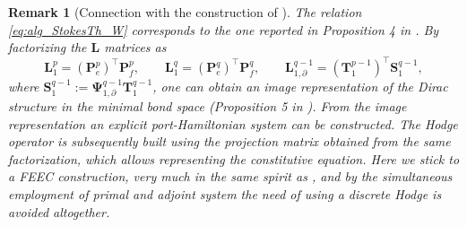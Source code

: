 \documentclass{elsarticle}
\newtheorem{remark}{Remark}
\begin{document}
\begin{remark}[Connection with the construction of \cite{kotyczka2018weak}]
The relation \eqref{eq:alg_StokesTh_W} corresponds to the one reported in Proposition 4 in \cite{kotyczka2018weak}. By factorizing the $\mathbf{L}$ matrices as 
$$\mathbf{L}^p_1 = (\mathbf{P}_e^{p})^\top \mathbf{P}_f^p, \qquad  \mathbf{L}^q_1 = (\mathbf{P}_e^{q})^\top \mathbf{P}_f^q, \qquad  \mathbf{L}^{q-1}_{1, \partial} = (\mathbf{T}^{p-1}_1)^\top \mathbf{S}^{q-1}_1, $$ 
where $\mathbf{S}^{q-1}_1:=\mathbf{\Psi}^{q-1}_{1, \partial} \mathbf{T}^{q-1}_1$, one can obtain an image representation of the Dirac structure in the minimal bond space (Proposition 5 in \cite{kotyczka2018weak}). From the image representation an explicit port-Hamiltonian system can be constructed. The Hodge operator is subsequently built using the projection matrix obtained from the same factorization, which allows representing the constitutive equation. Here we stick to a FEEC construction, very much in the same spirit as \cite{cardoso2020pfem}, and by the simultaneous employment of primal and adjoint system the need of using a discrete Hodge is avoided altogether.
\end{remark}
\end{document}
